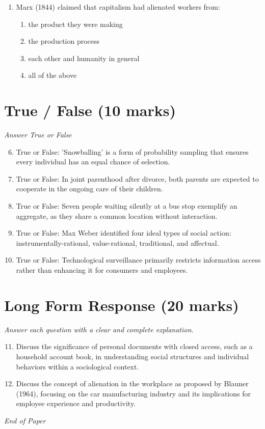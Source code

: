 \documentclass[12pt]{article}
\begin{document}
\begin{enumerate}[label=\arabic*.]
\begin{enumerate}[label=(\alph*)]
    \item common activities involving all-round relationships
    \item a fixed geographical location
    \item collective action based on common interests
\end{enumerate}
\item Marx (1844) claimed that capitalism had alienated workers from:
\begin{enumerate}[label=(\alph*)]
    \item the product they were making
    \item the production process
    \item each other and humanity in general
    \item all of the above
\end{enumerate}
\end{enumerate}

\section*{True / False (10 marks)}
\textit{Answer True or False}
\begin{enumerate}[label=\arabic*.]
\setcounter{enumi}{5}
\item True or False: 'Snowballing' is a form of probability sampling that ensures every individual has an equal chance of selection.
\item True or False: In joint parenthood after divorce, both parents are expected to cooperate in the ongoing care of their children.
\item True or False: Seven people waiting silently at a bus stop exemplify an aggregate, as they share a common location without interaction.
\item True or False: Max Weber identified four ideal types of social action: instrumentally-rational, value-rational, traditional, and affectual.
\item True or False: Technological surveillance primarily restricts information access rather than enhancing it for consumers and employees.
\end{enumerate}

\section*{Long Form Response (20 marks)}
\textit{Answer each question with a clear and complete explanation.}
\begin{enumerate}[label=\arabic*.]
\setcounter{enumi}{10}
\item Discuss the significance of personal documents with closed access, such as a household account book, in understanding social structures and individual behaviors within a sociological context.
\item Discuss the concept of alienation in the workplace as proposed by Blauner (1964), focusing on the car manufacturing industry and its implications for employee experience and productivity.
\end{enumerate}

\vfill
\noindent\textit{End of Paper}
\end{document}
